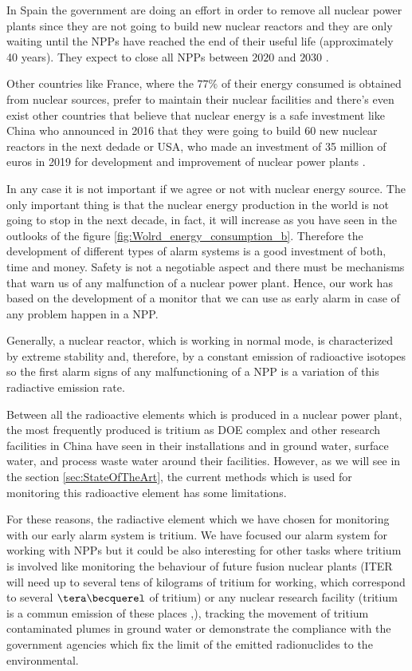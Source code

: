 In Spain the government are doing an effort in order to remove all nuclear power plants since they are not going to build new nuclear reactors and they are only waiting until the NPPs have reached the end of their useful life (approximately 40 years). They expect to close all NPPs between $2020$ and $2030$ \cite{CloseNPP}. 

Other countries like France, where the $77\%$ of their energy consumed is obtained from nuclear sources, prefer to maintain their nuclear facilities and there's even exist other countries that believe that nuclear energy is a safe investment like China who announced in 2016 that they were going to build 60 new nuclear reactors in the next dedade \cite{60ReactorsChina} or USA, who made an investment of 35 million of euros in 2019 for development and improvement of nuclear power plants \cite{35MillionsUSA}. 

In any case it is not important if we agree or not with nuclear energy source. The only important thing is that the nuclear energy production in the world is not going to stop in the next decade, in fact, it will increase as you have seen in the outlooks of the figure \ref{fig:Wolrd_energy_consumption_b}. Therefore the development of  different types of alarm systems is a good investment of both, time and money. Safety is not a negotiable aspect and there must be mechanisms that warn us of any malfunction of a nuclear power plant. Hence, our work has based on the development of a monitor that we can use as early alarm in case of any problem happen in a NPP.

Generally, a nuclear reactor, which is working in normal mode, is characterized by extreme stability and, therefore, by a constant emission of radioactive isotopes so the first alarm signs of any malfunctioning of a NPP is a variation of this radiactive emission rate.

Between all the radioactive elements which is produced in a nuclear power plant, the most frequently produced is tritium as DOE complex \cite{FiberDetector1a} \cite{FiberDetector1b}  and other research facilities in China \cite{CommonEmissionTritium} have seen in their installations and in ground water, surface water, and process waste water around their facilities. However, as we will see in the section \ref{sec:StateOfTheArt}, the current methods which is used for monitoring this radioactive element has some limitations. 

For these reasons, the radiactive element which we have chosen for monitoring with our early alarm system is tritium. We have focused our alarm system for working with NPPs but it could be also interesting for other tasks where tritium is involved like monitoring the behaviour of future fusion nuclear plants (ITER will need up to several tens of kilograms of tritium for working, which correspond to several $\tera\becquerel$ of tritium) or any nuclear research facility (tritium is a commun emission of these places \cite{FERMILAB},\cite{BrookHavenNationalLaboratory}),  tracking the movement of tritium contaminated plumes in ground water \cite{TrackingTritium} or demonstrate the compliance with the government agencies which fix the limit of the emitted radionuclides to the environmental. 

